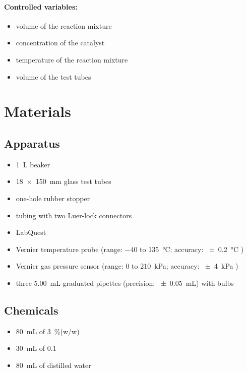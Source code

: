 \documentclass[a4paper, 12pt]{article}
\begin{document}
\paragraph{Controlled variables:}
\begin{itemize}
    \itemsep 0em
    \item volume of the reaction mixture
    \item concentration of the  catalyst
    \item temperature of the reaction mixture
    \item volume of the test tubes
\end{itemize}

\section*{Materials}
\subsection*{Apparatus}
\begin{itemize}
    \itemsep 0em
    \item \SI{1}{\L} beaker
    \item \SI{18x150}{\mm} glass test tubes
    \item one-hole rubber stopper
    \item tubing with two Luer-lock connectors
    \item LabQuest
    \item Vernier temperature probe (range: \num{-40} to \SI{135}{\celsius}; accuracy: \SI{+-0.2}{\celsius} \autocite{vernier_temperature})
    \item Vernier gas pressure sensor (range: \num{0} to \SI{210}{\kPa}; accuracy: \SI{+-4}{\kPa} \autocite{vernier_gas_pressure})
    \item three \SI{5.00}{\mL} graduated pipettes (precision: \SI{+-0.05}{\mL}) with bulbs
\end{itemize}

\subsection*{Chemicals}
\begin{itemize}
    \itemsep 0em
    \item \SI{80}{\mL} of \SI{3}{\percent}(w/w) 
    \item \SI{30}{\mL} of \SI{0.1}{\molar} 
    \item \SI{80}{\mL} of distilled water
\end{itemize}
\end{document}
